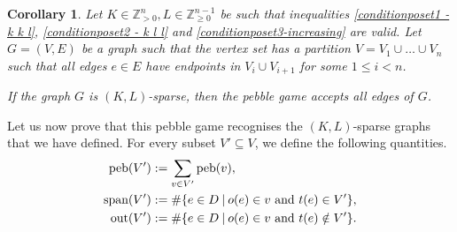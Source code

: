 \documentclass[10pt,a4paper]{article}
\newtheorem{corollary}[theorem]{Corollary}
\newcommand{\out}{\textup{out}}
\newcommand{\spa}{\textup{span}}
\newcommand{\peb}{\textup{peb}}
\begin{document}
\begin{corollary}
  Let $K\in \mathbb{Z}_{>0}^{n}, L\in \mathbb{Z}_{\geq 0}^{n-1}$ be such that inequalities \eqref{conditionposet1 -k k l}, \eqref{conditionposet2 - k l l} and \eqref{conditionposet3-increasing} are valid. Let $G=(V,E)$ be a graph such that the vertex set has a partition $V=V_1\cup \dots \cup V_n$ such that all edges $e\in E$ have endpoints in $V_{i} \cup V_{i+1}$ for some $1 \leq i < n$. 
  
  If the graph $G$ is $(K,L)$-sparse, then the pebble game accepts all edges of $G$.
\end{corollary}

Let us now prove that this pebble game recognises the $(K,L)$-sparse graphs that we have defined. For every subset $V' \subseteq V$, we define the following quantities.
\begin{align*}
    \peb(V')&:= \sum_{v\in V'} \peb(v),\\
    \spa(V')&:=\# \{e\in D \: \vert \: o(e) \in v \text{ and } t(e) \in V' \}, \\
    \out(V')&:=\# \{e\in D \: \vert \: o(e) \in v \text{ and } t(e) \notin V' \}.
\end{align*}
\end{document}
